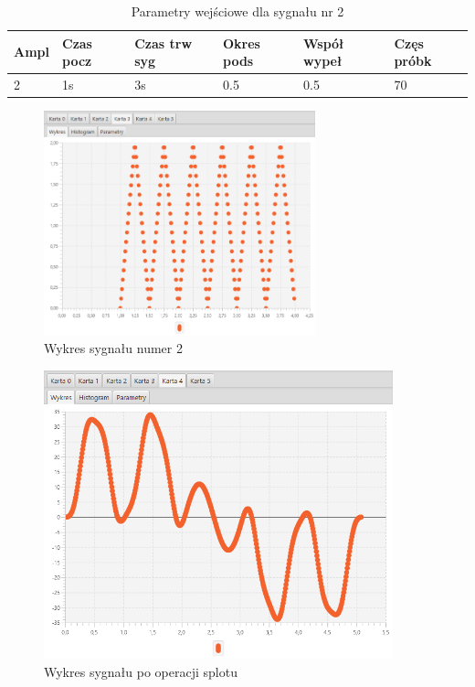 \documentclass[12pt]{article}
\begin{document}
{{{                \begin{table}[H]
                    \centering
                    \begin{tabular}{|l|l|l|l|l|l|}
                        \hline
                        Ampl & Czas pocz & Czas trw syg & Okres pods & Współ wypeł & Częs próbk   \\\hline
                        2 & 1s & 3s & 0.5 & 0.5 & 70           \\\hline
                    \end{tabular}
                    \caption{Parametry wejściowe dla sygnału nr 2}
                \end{table}
                \begin{figure}[H]
                    \centering
                    \includegraphics[width=0.7\textwidth]{img/result/convolution/experiment3/data_124722.png}
                    \caption{Wykres sygnału numer 2}
                \end{figure}

                \begin{figure}[H]
                    \centering
                    \includegraphics[width=0.9\textwidth]{img/result/convolution/experiment3/data_124733.png}
                    \caption{Wykres sygnału po operacji splotu}
                \end{figure}
            }
            \newpage

}}
\end{document}
